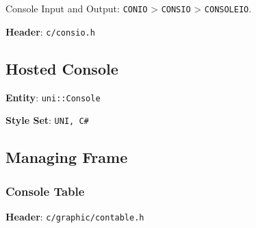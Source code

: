 Console Input and Output: \verb|CONIO| \textgreater{} \verb|CONSIO| \textgreater{} \verb|CONSOLEIO|.

\textbf{Header}: \verb|c/consio.h|



\subsection{Hosted Console}

\textbf{Entity}: \verb|uni::Console|

\textbf{Style Set}: \verb|UNI, C#|



\subsection{Managing Frame}



\subsubsection{Console Table}

\textbf{Header}: \verb|c/graphic/contable.h|

